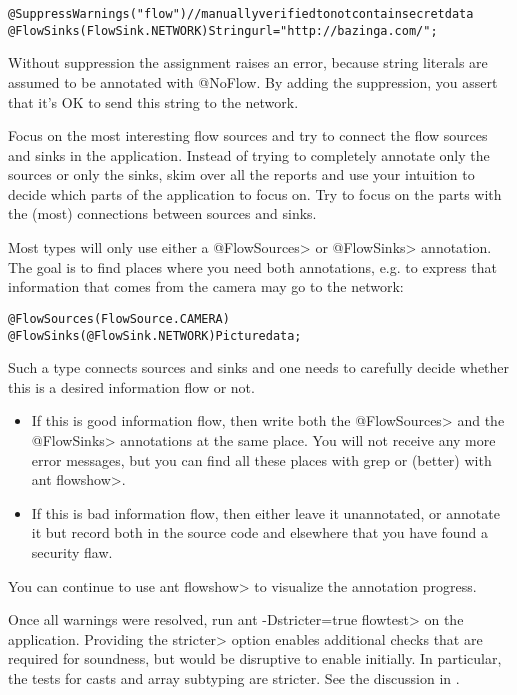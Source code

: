 \begin{alltt}
    @SuppressWarnings("flow") // manually verified to not contain secret data
    @FlowSinks(FlowSink.NETWORK) String url = "http://bazinga.com/";
\end{alltt}

Without suppression the assignment raises an error, because string literals
are assumed to be annotated with @NoFlow. By adding the suppression, you
assert that it's OK to send this string to the network. 

Focus on the most interesting flow sources and try to connect the flow
sources and sinks in the application. Instead of trying to completely
annotate only the sources or only the sinks, skim over all the reports
and use your intuition to decide which parts of the application to
focus on. Try to focus on the parts with the (most) connections
between sources and sinks.

Most types will only use either a \<@FlowSources> or \<@FlowSinks>
annotation.
The goal is to find places where you need both annotations, e.g. to
express that information that comes from the camera may go to the
network:

\begin{alltt}
    @FlowSources(FlowSource.CAMERA)
    @FlowSinks(@FlowSink.NETWORK) Picture data;
\end{alltt}

Such a type connects sources and sinks and one needs to carefully
decide whether this is a desired information flow or not.
\begin{itemize}
\item If this is good information flow, then write both the \<@FlowSources>
  and the \<@FlowSinks> annotations at the same place. You will not
  receive any more error messages, but you can find all these places
  with grep or (better) with \<ant flowshow>.
\item If this is bad information flow, then either leave it unannotated,
  or annotate it but record both in the source code and elsewhere that
  you have found a security flaw.
\end{itemize}

You can continue to use \<ant flowshow> to visualize the annotation
progress.

Once all warnings were resolved, run \<ant -Dstricter=true flowtest> on
the application.
Providing the \<stricter> option enables additional checks that are
required for soundness, but would be disruptive to enable initially.
In particular, the tests for casts and array subtyping are stricter.
See the discussion in .



